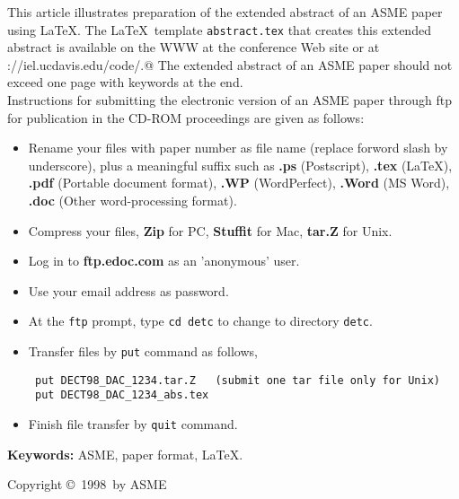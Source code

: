 \documentclass[11pt]{article}
\def\confshortname{detc}
\def\confyear{1998}
\begin{document}
\vspace{22pt}
{\footnotesize{\tir
This article illustrates preparation of the extended abstract of
an ASME paper using \LaTeX.
The \LaTeX\  template \verb+abstract.tex+
that creates this extended abstract is available on the WWW at
the conference Web site 
or at \verb@http://iel.ucdavis.edu/code/.@
The extended abstract of an ASME paper should not exceed one page
with keywords at the end.\\

Instructions for submitting the electronic version of 
an ASME paper through ftp for publication in the CD-ROM proceedings 
are given as follows:
\begin{itemize}
\item
Rename your files with paper number as file name (replace forword slash by underscore), 
plus a meaningful
suffix such as {\bf .ps} (Postscript), 
{\bf .tex} (\LaTeX),
{\bf .pdf} (Portable document format),
{\bf .WP} (WordPerfect),
{\bf .Word} (MS Word),
{\bf .doc} (Other word-processing format).
\item
Compress your files, {\bf Zip} for PC, {\bf Stuffit} for Mac, {\bf tar.Z} for Unix.
\item
Log in to {\bf ftp.edoc.com} as an 'anonymous' user.
\item
Use your email address as password.
\item
At the {\tt ftp} prompt, type {\tt cd \confshortname} to change to directory {\tt \confshortname}.
\item
Transfer files by {\tt put} command as follows,
\begin{verbatim}
 put DECT98_DAC_1234.tar.Z   (submit one tar file only for Unix)
 put DECT98_DAC_1234_abs.tex
\end{verbatim}
\item
Finish file transfer by {\tt quit} command.
\end{itemize}


\vspace{10pt}
{\bf Keywords:} ASME, paper format, \LaTeX.


}}

\vspace{\fill}
{\scriptsize{\hv
\begin{flushbottom}
\begin{flushright}
Copyright \copyright\ \confyear\ by ASME
\end{flushright}
\end{flushbottom}
}}
\end{document}
